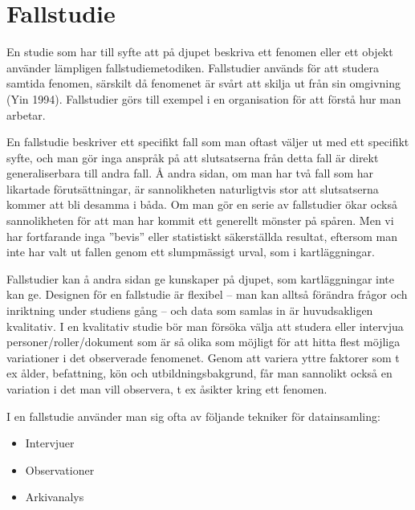 \section{Fallstudie }\label{fallstudie}

En studie som har till syfte att på djupet beskriva ett fenomen eller
ett objekt använder lämpligen fallstudiemetodiken. Fallstudier används
för att studera samtida fenomen, särskilt då fenomenet är svårt att
skilja ut från sin omgivning (Yin 1994). Fallstudier görs till exempel i
en organisation för att förstå hur man arbetar.

En fallstudie beskriver ett specifikt fall som man oftast väljer ut med
ett specifikt syfte, och man gör inga anspråk på att slutsatserna från
detta fall är direkt generaliserbara till andra fall. Å andra sidan, om
man har två fall som har likartade förutsättningar, är sannolikheten
naturligtvis stor att slutsatserna kommer att bli desamma i båda. Om man
gör en serie av fallstudier ökar också sannolikheten för att man har
kommit ett generellt mönster på spåren. Men vi har fortfarande inga
''bevis'' eller statistiskt säkerställda resultat, eftersom man inte har
valt ut fallen genom ett slumpmässigt urval, som i kartläggningar.

Fallstudier kan å andra sidan ge kunskaper på djupet, som kartläggningar
inte kan ge. Designen för en fallstudie är flexibel
\protect\hypertarget{OLE_LINK4}{}{\protect\hypertarget{OLE_LINK3}{}{}}--
man kan alltså förändra frågor och inriktning under studiens gång -- och
data som samlas in är huvudsakligen kvalitativ. I en kvalitativ studie
bör man försöka välja att studera eller intervjua
personer/roller/dokument som är så olika som möjligt för att hitta flest
möjliga variationer i det observerade fenomenet. Genom att variera yttre
faktorer som t ex ålder, befattning, kön och utbildningsbakgrund, får
man sannolikt också en variation i det man vill observera, t ex åsikter
kring ett fenomen.

I en fallstudie använder man sig ofta av följande tekniker för
datainsamling:

\begin{itemize}
\item
  Intervjuer
\item
  Observationer
\item
  Arkivanalys
\end{itemize}

